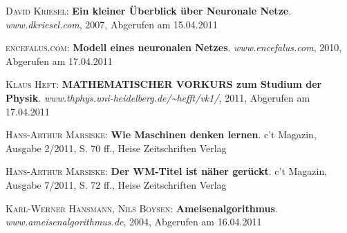 \begin{thebibliography}{---}

  \textsc{David Kriesel}: 
  \textbf{Ein kleiner Überblick über Neuronale Netze}.
  \emph{www.dkriesel.com}, 2007, Abgerufen am 15.04.2011


  \textsc{encefalus.com}: 
  \textbf{Modell eines neuronalen Netzes}.
  \emph{www.encefalus.com}, 2010, Abgerufen am 17.04.2011
  
  \textsc{Klaus Heft}: 
  \textbf{MATHEMATISCHER VORKURS zum Studium der Physik}.
  \emph{www.thphys.uni-heidelberg.de/\textasciitilde{}hefft/vk1/}, 2011, Abgerufen am 17.04.2011

  \textsc{Hans-Arthur Marsiske}: 
  \textbf{Wie Maschinen denken lernen}.
  c't Magazin, Ausgabe 2/2011, S. 70 ff., Heise Zeitschriften Verlag

  \textsc{Hans-Arthur Marsiske}: 
  \textbf{Der WM-Titel ist näher gerückt}.
  c't Magazin, Ausgabe 7/2011, S. 72 ff., Heise Zeitschriften Verlag

  \textsc{Karl-Werner Hansmann, Nils Boysen}: 
  \textbf{Ameisenalgorithmus}.
  \emph{www.ameisenalgorithmus.de}, 2004, Abgerufen am 16.04.2011


\end{thebibliography}

